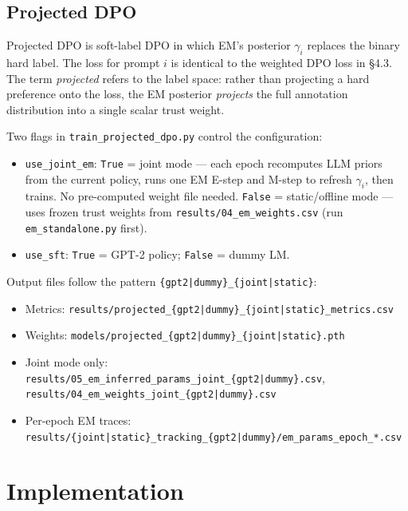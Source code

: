 \documentclass[11pt, a4paper]{article}
\begin{document}
\subsection{Projected DPO}
\label{sec:proj-dpo}

Projected DPO is soft-label DPO in which EM's posterior $\gamma_i$ replaces the binary
hard label. The loss for prompt $i$ is identical to the weighted DPO loss in \S4.3.
The term \textit{projected} refers to the label space: rather than projecting a hard
preference onto the loss, the EM posterior \emph{projects} the full annotation distribution
into a single scalar trust weight.

Two flags in \texttt{train\_projected\_dpo.py} control the configuration:

\begin{itemize}[noitemsep]
  \item \texttt{use\_joint\_em}: \texttt{True} = joint mode --- each epoch recomputes
        LLM priors from the current policy, runs one EM E-step and M-step to refresh
        $\gamma_i$, then trains. No pre-computed weight file needed.
        \texttt{False} = static/offline mode --- uses frozen trust weights from
        \texttt{results/04\_em\_weights.csv} (run \texttt{em\_standalone.py} first).
  \item \texttt{use\_sft}: \texttt{True} = GPT-2 policy; \texttt{False} = dummy LM.
\end{itemize}

Output files follow the pattern \texttt{\{gpt2|dummy\}\_\{joint|static\}}:

\begin{itemize}[noitemsep]
  \item Metrics: \texttt{results/projected\_\{gpt2|dummy\}\_\{joint|static\}\_metrics.csv}
  \item Weights: \texttt{models/projected\_\{gpt2|dummy\}\_\{joint|static\}.pth}
  \item Joint mode only: \texttt{results/05\_em\_inferred\_params\_joint\_\{gpt2|dummy\}.csv},\\
        \texttt{results/04\_em\_weights\_joint\_\{gpt2|dummy\}.csv}
  \item Per-epoch EM traces: \texttt{results/\{joint|static\}\_tracking\_\{gpt2|dummy\}/em\_params\_epoch\_*.csv}
\end{itemize}

\newpage

\section{Implementation}
\end{document}
